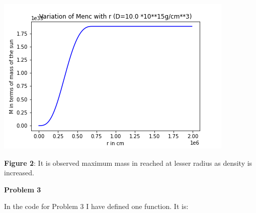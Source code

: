 \documentclass{article}
\begin{document}
\begin{center}
\begin{multicols}{2}
\begin{center}
        \end{center}
\columnbreak
       \includegraphics[scale=0.3]{Images/Mr_pb2_4}
\end{multicols}
\textbf{Figure 2}: It is observed maximum mass in reached at lesser radius as density is increased.
\end{center}
\vspace{0.2em}


\textbf{Problem 3}\vspace{1.5em}

In the code for Problem 3 I have defined one function. It is:
  \vspace{0.2em}
  
\end{document}
